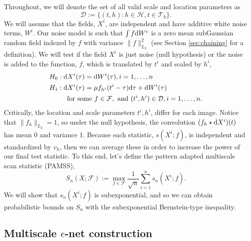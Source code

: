 Throughout, we will denote the set of all valid scale and location parameters as
$$
\mathcal D := \{(t,h) : h \in \mathcal H, t \in \mathcal T_h \}.
$$
We will assume that the fields, $X^i$, are independent and have additive white noise terms, $W^i$.
Our noise model is such that $\int f {\rm d} W^i$ is a zero mean subGaussian random field indexed by $f$ with variance $\| f\|_{L_2}^2$ (see Section \ref{sec:chaining} for a definition).
We will test if the field $X^i$ is just noise (null hypothesis) or the noise is added to the function, $f$, which is translated by $t^i$ and scaled by $h^i$,
\begin{align*}
    H_0&: {\rm d} X^i(\tau) = {\rm d} W^i(\tau), i=1,\ldots,n \\
    H_1&: {\rm d} X^i(\tau) = \mu f_{h^i}(t^i - \tau) {\rm d} \tau + {\rm d} W^i(\tau) \\
    &\quad {\rm ~for~some~} f \in \mathcal F, {\rm~and~} (t^i, h^i) \in \mathcal D, i =1,\ldots,n.
\end{align*}
Critically, the location and scale parameters $t^i, h^i$, differ for each image.  
Notice that $\|f_h\|_{L_2} = 1$, so under the null hypothesis, the convolution $(f_h \star {\rm d} X^i)(t)$ has mean $0$ and variance $1$.
Because each statistic, $s(X^i; f)$, is independent and standardized by $v_h$, then we can average these in order to increase the power of our final test statistic.
To this end, let's define the pattern adapted multiscale scan statistic (PAMSS), 
\begin{equation}
S_n(X; \mathcal F) := \max_{f \in \mathcal F} \frac{1}{\sqrt n} \sum_{i=1}^n s_n(X^i; f).
\end{equation}
We will show that $s_n(X^i;f)$ is subexponential, and so we can obtain probabilistic bounds on $S_n$ with the subexponential Bernstein-type inequality.


\subsection{Multiscale $\epsilon$-net construction}

